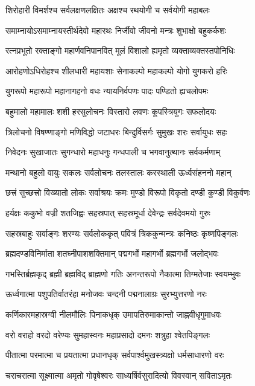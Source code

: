\twolineshloka
{शिरोहारी विमर्शश्च सर्वलक्षणलक्षितः}%
{अक्षश्च रथयोगी च सर्वयोगी महाबलः}%

\twolineshloka
{समाम्नायोऽसमाम्नायस्तीर्थदेवो महारथः}%
{निर्जीवो जीवनो मन्त्रः शुभाक्षो बहुकर्कशः}%

\twolineshloka
{रत्नप्रभूतो रक्ताङ्गो महार्णवनिपानवित्}%
{मूलं विशालो ह्यमृतो व्यक्ताव्यक्तस्तपोनिधिः}%

\twolineshloka
{आरोहणोऽधिरोहश्च शीलधारी महायशाः}%
{सेनाकल्पो महाकल्पो योगो युगकरो हरिः}%

\twolineshloka
{युगरूपो महारूपो महानागहनो वधः}%
{न्यायनिर्वपणः पादः पण्डितो ह्यचलोपमः}%

\twolineshloka
{बहुमालो महामालः शशी हरसुलोचनः}%
{विस्तारो लवणः कूपस्त्रियुगः सफलोदयः}%

\twolineshloka
{त्रिलोचनो विषण्णाङ्गो मणिविद्धो जटाधरः}%
{बिन्दुर्विसर्गः सुमुखः शरः सर्वायुधः सहः}%

\twolineshloka
{निवेदनः सुखाजातः सुगन्धारो महाधनुः}%
{गन्धपाली च भगवानुत्थानः सर्वकर्मणाम्}%

\twolineshloka
{मन्थानो बहुलो वायुः सकलः सर्वलोचनः}%
{तलस्तालः करस्थाली ऊर्ध्वसंहननो महान्}%

\twolineshloka
{छत्त्रं सुच्छत्त्रो विख्यातो लोकः सर्वाश्रयः क्रमः}%
{मुण्डो विरूपो विकृतो दण्डी कुण्डी विकुर्वणः}%

\twolineshloka
{हर्यक्षः ककुभो वज्री शतजिह्वः सहस्रपात्}%
{सहस्रमूर्धा देवेन्द्रः सर्वदेवमयो गुरुः}%

\twolineshloka
{सहस्रबाहुः सर्वाङ्गः शरण्यः सर्वलोककृत्}%
{पवित्रं त्रिककुन्मन्त्रः कनिष्ठः कृष्णपिङ्गलः}%

\twolineshloka
{ब्रह्मदण्डविनिर्माता शतघ्नीपाशशक्तिमान्}%
{पद्मगर्भो महागर्भो ब्रह्मगर्भो जलोद्भवः}%

\twolineshloka
{गभस्तिर्ब्रह्मकृद् ब्रह्मी ब्रह्मविद् ब्राह्मणो गतिः}%
{अनन्तरूपो नैकात्मा तिग्मतेजाः स्वयम्भुवः}%

\twolineshloka
{ऊर्ध्वगात्मा पशुपतिर्वातरंहा मनोजवः}%
{चन्दनी पद्मनालाग्रः सुरभ्युत्तरणो नरः}%

\twolineshloka
{कर्णिकारमहास्रग्वी नीलमौलिः पिनाकधृक्}%
{उमापतिरुमाकान्तो जाह्नवीधृगुमाधवः}%

\twolineshloka
{वरो वराहो वरदो वरेण्यः सुमहास्वनः}%
{महाप्रसादो दमनः शत्रुहा श्वेतपिङ्गलः}%

\twolineshloka
{पीतात्मा परमात्मा च प्रयतात्मा प्रधानधृक्}%
{सर्वपार्श्वमुखस्त्र्यक्षो धर्मसाधारणो वरः}%

\twolineshloka
{चराचरात्मा सूक्ष्मात्मा अमृतो गोवृषेश्वरः}%
{साध्यर्षिर्वसुरादित्यो विवस्वान् सविताऽमृतः}%


